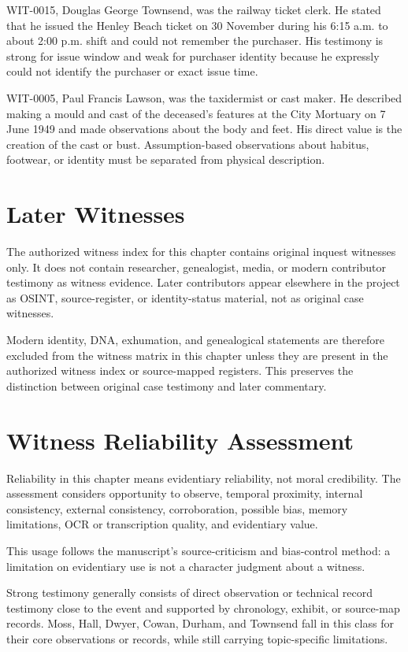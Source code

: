 WIT-0015, Douglas George Townsend, was the railway ticket clerk. He stated that he issued the Henley Beach ticket on 30 November during his 6:15 a.m. to about 2:00 p.m. shift and could not remember the purchaser. His testimony is strong for issue window and weak for purchaser identity because he expressly could not identify the purchaser or exact issue time.

WIT-0005, Paul Francis Lawson, was the taxidermist or cast maker. He described making a mould and cast of the deceased's features at the City Mortuary on 7 June 1949 and made observations about the body and feet. His direct value is the creation of the cast or bust. Assumption-based observations about habitus, footwear, or identity must be separated from physical description.

\section{Later Witnesses}

The authorized witness index for this chapter contains original inquest witnesses only. It does not contain researcher, genealogist, media, or modern contributor testimony as witness evidence. Later contributors appear elsewhere in the project as OSINT, source-register, or identity-status material, not as original case witnesses.

Modern identity, DNA, exhumation, and genealogical statements are therefore excluded from the witness matrix in this chapter unless they are present in the authorized witness index or source-mapped registers. This preserves the distinction between original case testimony and later commentary.

\section{Witness Reliability Assessment}

Reliability in this chapter means evidentiary reliability, not moral credibility. The assessment considers opportunity to observe, temporal proximity, internal consistency, external consistency, corroboration, possible bias, memory limitations, OCR or transcription quality, and evidentiary value.

This usage follows the manuscript's source-criticism and bias-control method: a limitation on evidentiary use is not a character judgment about a witness.

Strong testimony generally consists of direct observation or technical record testimony close to the event and supported by chronology, exhibit, or source-map records. Moss, Hall, Dwyer, Cowan, Durham, and Townsend fall in this class for their core observations or records, while still carrying topic-specific limitations.

